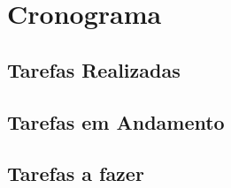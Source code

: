 \chapter{Cronograma}
\label{cap:experimentos}

\section{Tarefas Realizadas}
\label{sec:tarefas_realizadas}

\section{Tarefas em Andamento}
\label{sec:tarefas_andamento}

\section{Tarefas a fazer}
\label{sec:tarefas_a_fazer}

